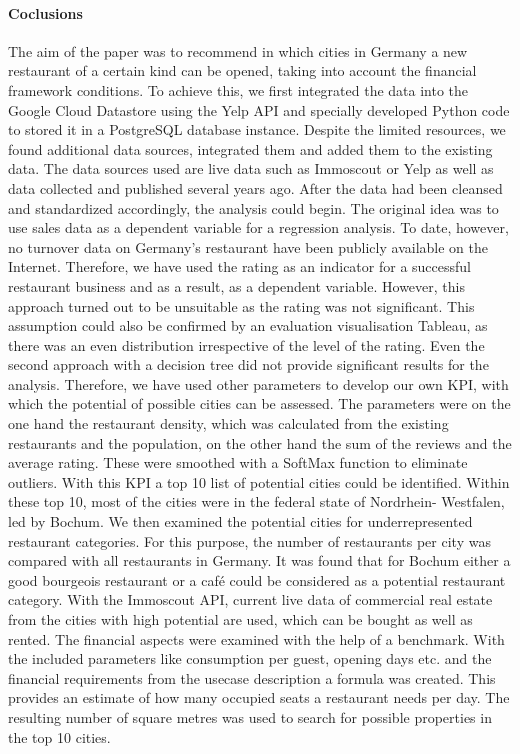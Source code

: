 \paragraph{Coclusions}
The aim of the paper was to recommend in which cities in Germany a new restaurant of a certain kind can be opened, taking into account the financial framework conditions. To achieve this, we first integrated the data into the Google Cloud Datastore using the Yelp API and specially developed Python code to stored it in a PostgreSQL database instance. Despite the limited resources, we found additional data sources, integrated them and added them to the existing data. The data sources used are live data such as Immoscout or Yelp as well as data collected and published several years ago. After the data had been cleansed and standardized accordingly, the analysis could begin. The original idea was to use sales data as a dependent variable for a regression analysis. To date, however, no turnover data on Germany's restaurant have been publicly available on the Internet. Therefore, we have used the rating as an indicator for a successful restaurant business and as a result, as a dependent variable. However, this approach turned out to be unsuitable as the rating was not significant. This assumption could also be confirmed by an evaluation visualisation Tableau, as there was an even distribution irrespective of the level of the rating. %
Even the second approach with a decision tree did not provide significant results for the analysis. Therefore, we have used other parameters to develop our own KPI, with which the potential of possible cities can be assessed. The parameters were on the one hand the restaurant density, which was calculated from the existing restaurants and the population, on the other hand the sum of the reviews and the average rating. These were smoothed with a SoftMax function to eliminate outliers. With this KPI a top 10 list of potential cities could be identified. Within these top 10, most of the cities were in the federal state of Nordrhein- Westfalen, led by Bochum. We then examined the potential cities for underrepresented restaurant categories. For this purpose, the number of restaurants per city was compared with all restaurants in Germany. It was found that for Bochum either a good bourgeois restaurant or a café could be considered as a potential restaurant category.
With the Immoscout API, current live data of commercial real estate from the cities with high potential are used, which can be bought as well as rented.
The financial aspects were examined with the help of a benchmark. With the included parameters like consumption per guest, opening days etc. and the financial requirements from the usecase description a formula was created. This provides an estimate of how many occupied seats a restaurant needs per day. The resulting number of square metres was used to search for possible properties in the top 10 cities. %
